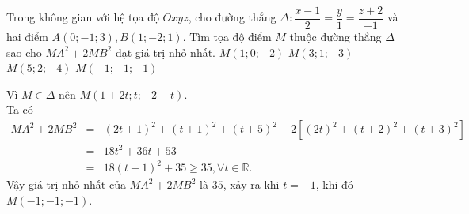 \begin{ex}%
	Trong không gian với hệ tọa độ $Oxyz$, cho đường thẳng $\Delta \colon \dfrac{x-1}{2}=\dfrac{y}{1}=\dfrac{z+2}{-1}$ và hai điểm $A(0;-1;3), B(1;-2;1)$. Tìm tọa độ điểm $M$ thuộc đường thẳng $\Delta$ sao cho $MA^2+2MB^2$ đạt giá trị nhỏ nhất.
	\choice
	{$M(1;0;-2)$}
	{$M(3;1;-3)$}
	{$M(5;2;-4)$}
	{\True $M(-1;-1;-1)$}
	\loigiai
	{ Vì $M \in \Delta$ nên $M\left( 1+2t;t;-2-t\right)$.\\
	Ta có 
	\begin{eqnarray*}
	 MA^2+2MB^2&=&(2t+1)^2+(t+1)^2+(t+5)^2 +2 \left[ (2t)^2+ (t+2)^2 +(t+3)^2\right]\\
		&= & 18t^2 +36t +53\\
		&= & 18(t+1)^2+35 \geq 35, \forall t \in \mathbb{R}.
	\end{eqnarray*}
Vậy giá trị nhỏ nhất của $MA^2+2MB^2$ là $35$, xảy ra khi $t=-1$, khi đó $M(-1;-1;-1)$.
	
	
	}
\end{ex}

